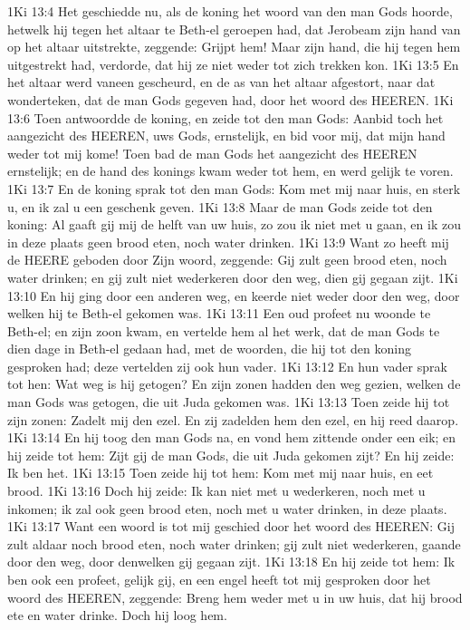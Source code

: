 1Ki 13:4  Het geschiedde nu, als de koning het woord van den man Gods hoorde, hetwelk hij tegen het altaar te Beth-el geroepen had, dat Jerobeam zijn hand van op het altaar uitstrekte, zeggende: Grijpt hem! Maar zijn hand, die hij tegen hem uitgestrekt had, verdorde, dat hij ze niet weder tot zich trekken kon.
1Ki 13:5  En het altaar werd vaneen gescheurd, en de as van het altaar afgestort, naar dat wonderteken, dat de man Gods gegeven had, door het woord des HEEREN.
1Ki 13:6  Toen antwoordde de koning, en zeide tot den man Gods: Aanbid toch het aangezicht des HEEREN, uws Gods, ernstelijk, en bid voor mij, dat mijn hand weder tot mij kome! Toen bad de man Gods het aangezicht des HEEREN ernstelijk; en de hand des konings kwam weder tot hem, en werd gelijk te voren.
1Ki 13:7  En de koning sprak tot den man Gods: Kom met mij naar huis, en sterk u, en ik zal u een geschenk geven.
1Ki 13:8  Maar de man Gods zeide tot den koning: Al gaaft gij mij de helft van uw huis, zo zou ik niet met u gaan, en ik zou in deze plaats geen brood eten, noch water drinken.
1Ki 13:9  Want zo heeft mij de HEERE geboden door Zijn woord, zeggende: Gij zult geen brood eten, noch water drinken; en gij zult niet wederkeren door den weg, dien gij gegaan zijt.
1Ki 13:10  En hij ging door een anderen weg, en keerde niet weder door den weg, door welken hij te Beth-el gekomen was.
1Ki 13:11  Een oud profeet nu woonde te Beth-el; en zijn zoon kwam, en vertelde hem al het werk, dat de man Gods te dien dage in Beth-el gedaan had, met de woorden, die hij tot den koning gesproken had; deze vertelden zij ook hun vader.
1Ki 13:12  En hun vader sprak tot hen: Wat weg is hij getogen? En zijn zonen hadden den weg gezien, welken de man Gods was getogen, die uit Juda gekomen was.
1Ki 13:13  Toen zeide hij tot zijn zonen: Zadelt mij den ezel. En zij zadelden hem den ezel, en hij reed daarop.
1Ki 13:14  En hij toog den man Gods na, en vond hem zittende onder een eik; en hij zeide tot hem: Zijt gij de man Gods, die uit Juda gekomen zijt? En hij zeide: Ik ben het.
1Ki 13:15  Toen zeide hij tot hem: Kom met mij naar huis, en eet brood.
1Ki 13:16  Doch hij zeide: Ik kan niet met u wederkeren, noch met u inkomen; ik zal ook geen brood eten, noch met u water drinken, in deze plaats.
1Ki 13:17  Want een woord is tot mij geschied door het woord des HEEREN: Gij zult aldaar noch brood eten, noch water drinken; gij zult niet wederkeren, gaande door den weg, door denwelken gij gegaan zijt.
1Ki 13:18  En hij zeide tot hem: Ik ben ook een profeet, gelijk gij, en een engel heeft tot mij gesproken door het woord des HEEREN, zeggende: Breng hem weder met u in uw huis, dat hij brood ete en water drinke. Doch hij loog hem.
